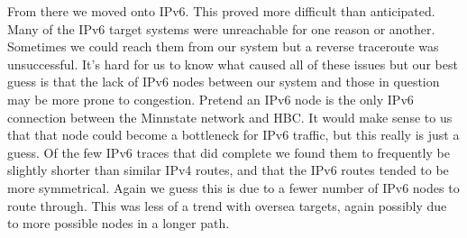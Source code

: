 \documentclass[prb,preprint]{revtex4-1}
\begin{document}
From there we moved onto IPv6. This proved more difficult than anticipated. Many of the IPv6 target systems were unreachable for one reason or another. Sometimes we could reach them from our system but a reverse traceroute was unsuccessful. It's hard for us to know what caused all of these issues but our best guess is that the lack of IPv6 nodes between our system and those in question may be more prone to congestion. Pretend an IPv6 node is the only IPv6 connection between the Minnstate network and HBC. It would make sense to us that that node could become a bottleneck for IPv6 traffic, but this really is just a guess. Of the few IPv6 traces that did complete we found them to frequently be slightly shorter than similar IPv4 routes, and that the IPv6 routes tended to be more symmetrical. Again we guess this is due to a fewer number of IPv6 nodes to route through. This was less of a trend with oversea targets, again possibly due to more possible nodes in a longer path.
\end{document}
